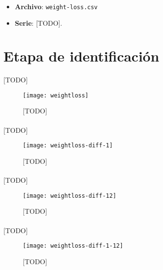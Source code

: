 \documentclass[a4paper, spanish]{article}
\begin{document}
  \maketitle

  \begin{itemize}
    \item \textbf{Archivo}: \texttt{weight-loss.csv}
    \item \textbf{Serie}: [TODO].
  \end{itemize}

  \section{Etapa de identificación}

    \paragraph{}
    [TODO]

    \begin{figure}
      \texttt{[image: weightloss]}
      \caption{[TODO]}
      \label{}
    \end{figure}

    \paragraph{}
    [TODO]

    \begin{figure}
      \texttt{[image: weightloss-diff-1]}
      \caption{[TODO]}
      \label{}
    \end{figure}

    \paragraph{}
    [TODO]

    \begin{figure}
      \texttt{[image: weightloss-diff-12]}
      \caption{[TODO]}
      \label{}
    \end{figure}

    \paragraph{}
    [TODO]

    \begin{figure}
      \texttt{[image: weightloss-diff-1-12]}
      \caption{[TODO]}
      \label{}
    \end{figure}
\end{document}
